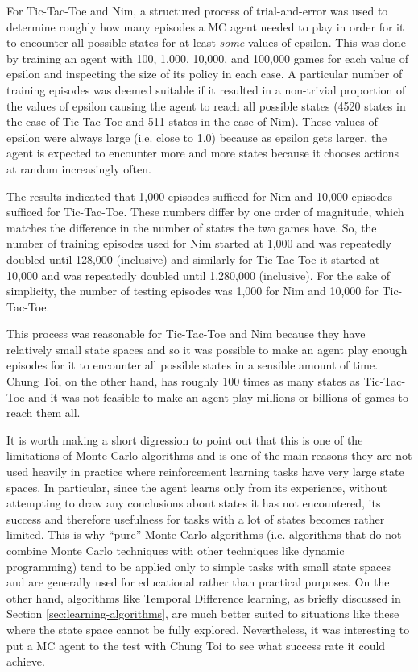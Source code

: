 \documentclass[11pt,a4paper]{report}
\begin{document}
For Tic-Tac-Toe and Nim, a structured process of trial-and-error was used to determine roughly how many episodes a MC agent needed to play in order for it to encounter all possible states for at least \emph{some} values of epsilon. This was done by training an agent with 100, 1,000, 10,000, and 100,000 games for each value of epsilon and inspecting the size of its policy in each case. A particular number of training episodes was deemed suitable if it resulted in a non-trivial proportion of the values of epsilon causing the agent to reach all possible states (4520 states in the case of Tic-Tac-Toe and 511 states in the case of Nim). These values of epsilon were always large (i.e. close to 1.0) because as epsilon gets larger, the agent is expected to encounter more and more states because it chooses actions at random increasingly often.

The results indicated that 1,000 episodes sufficed for Nim and 10,000 episodes sufficed for Tic-Tac-Toe. These numbers differ by one order of magnitude, which matches the difference in the number of states the two games have. So, the number of training episodes used for Nim started at 1,000 and was repeatedly doubled until 128,000 (inclusive) and similarly for Tic-Tac-Toe it started at 10,000 and was repeatedly doubled until 1,280,000 (inclusive). For the sake of simplicity, the number of testing episodes was 1,000 for Nim and 10,000 for Tic-Tac-Toe.

This process was reasonable for Tic-Tac-Toe and Nim because they have relatively small state spaces and so it was possible to make an agent play enough episodes for it to encounter all possible states in a sensible amount of time. Chung Toi, on the other hand, has roughly 100 times as many states as Tic-Tac-Toe and it was not feasible to make an agent play millions or billions of games to reach them all.

It is worth making a short digression to point out that this is one of the limitations of Monte Carlo algorithms and is one of the main reasons they are not used heavily in practice where reinforcement learning tasks have very large state spaces. In particular, since the agent learns only from its experience, without attempting to draw any conclusions about states it has not encountered, its success and therefore usefulness for tasks with a lot of states becomes rather limited. This is why ``pure'' Monte Carlo algorithms (i.e. algorithms that do not combine Monte Carlo techniques with other techniques like dynamic programming) tend to be applied only to simple tasks with small state spaces and are generally used for educational rather than practical purposes. On the other hand, algorithms like Temporal Difference learning, as briefly discussed in Section \ref{sec:learning-algorithms}, are much better suited to situations like these where the state space cannot be fully explored. Nevertheless, it was interesting to put a MC agent to the test with Chung Toi to see what success rate it could achieve.
\end{document}
